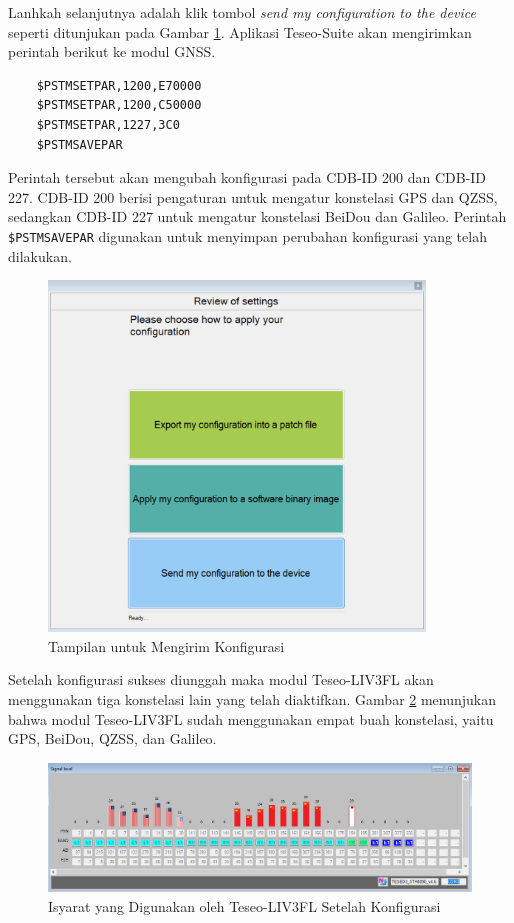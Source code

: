 Lanhkah selanjutnya adalah klik tombol \textit{send my configuration to the device} seperti ditunjukan pada Gambar \ref{Fig: kirim-konstelasi}. Aplikasi Teseo-Suite akan mengirimkan perintah berikut ke modul GNSS.
\begin{verbatim}
	$PSTMSETPAR,1200,E70000
	$PSTMSETPAR,1200,C50000
	$PSTMSETPAR,1227,3C0
	$PSTMSAVEPAR
\end{verbatim}
Perintah tersebut akan mengubah  konfigurasi pada CDB-ID 200 dan CDB-ID 227. CDB-ID 200 berisi pengaturan untuk mengatur konstelasi GPS dan QZSS, sedangkan CDB-ID 227 untuk mengatur konstelasi BeiDou dan Galileo. Perintah \texttt{\$PSTMSAVEPAR} digunakan untuk menyimpan perubahan konfigurasi yang telah dilakukan.

\begin{figure}[H]
	\centering
	\includegraphics[width=10cm]{contents/chapter-3/setting-konstelasi/kirim-konfigurasi.png}
	\caption{Tampilan untuk Mengirim Konfigurasi}
	\label{Fig: kirim-konstelasi}
\end{figure}

Setelah konfigurasi sukses diunggah maka modul Teseo-LIV3FL akan menggunakan tiga konstelasi lain yang telah diaktifkan. Gambar \ref{Fig: setelah-konfigurasi} menunjukan bahwa modul Teseo-LIV3FL sudah menggunakan empat buah konstelasi, yaitu GPS, BeiDou, QZSS, dan Galileo.

\begin{figure}[H]
	\centering
	\includegraphics[width=14cm]{contents/chapter-3/setting-konstelasi/setelah-konfigurasi.png}
	\caption{Isyarat yang Digunakan oleh Teseo-LIV3FL Setelah Konfigurasi}
	\label{Fig: setelah-konfigurasi}
	\end{figure}

